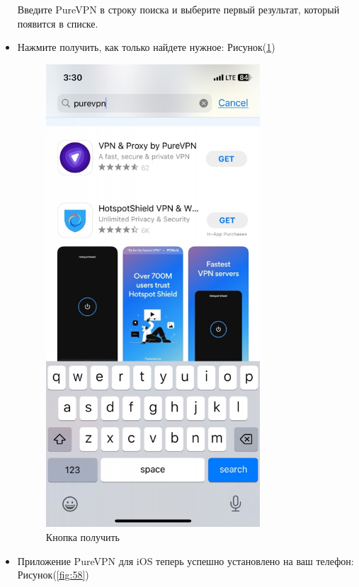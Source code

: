 \begin{itemize}
Введите PureVPN в строку поиска и выберите первый результат, который появится в списке.
\item Нажмите получить, как только найдете нужное:  Рисунок(\ref{fig:57})
\begin{figure}[H]
\includegraphics[width=8cm]{43.png}
\centering
\caption{Кнопка получить}
\label{fig:57}
\end{figure}
\item Приложение PureVPN для iOS теперь успешно установлено на ваш телефон:  Рисунок(\ref{fig:58})
\begin{figure}[H]

\end{figure}
\end{itemize}
